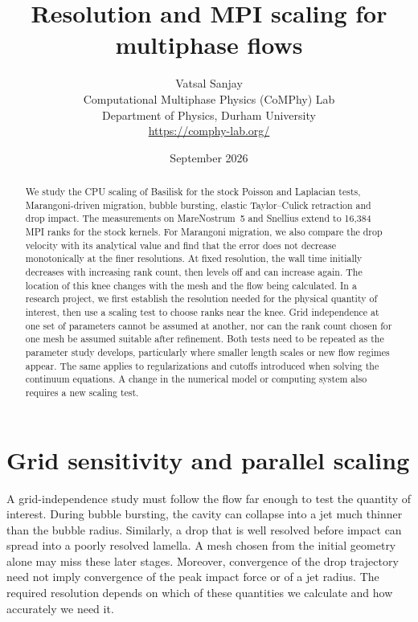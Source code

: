 \documentclass[11pt,a4paper]{article}
\title{\textbf{Resolution and MPI scaling for multiphase flows}}
\author{Vatsal Sanjay\\
\small Computational Multiphase Physics (CoMPhy) Lab\\
\small Department of Physics, Durham University\\
\small \url{https://comphy-lab.org/}}
\date{September 2026}
\begin{document}
\maketitle

\begin{abstract}

We study the CPU scaling of Basilisk for the stock Poisson and Laplacian
tests, Marangoni-driven migration, bubble bursting, elastic Taylor--Culick
retraction and drop impact. The measurements on MareNostrum~5 and Snellius
extend to 16,384 MPI ranks for the stock kernels. For Marangoni migration,
we also compare the drop velocity with its analytical value and find that
the error does not decrease monotonically at the finer resolutions.
At fixed resolution, the wall time initially decreases with increasing
rank count, then levels off and can increase again. The location of this
knee changes with the mesh and the flow being calculated. In a research
project, we first establish the resolution needed for the physical quantity
of interest, then use a scaling test to choose ranks near the knee.
Grid independence at one set of parameters cannot be assumed at another,
nor can the rank count chosen for one mesh be assumed suitable after
refinement. Both tests need to be repeated as the parameter study develops,
particularly where smaller length scales or new flow regimes appear.
The same applies to regularizations and cutoffs introduced when solving
the continuum equations. A change in the numerical model or computing
system also requires a new scaling test.

\end{abstract}

\section{Grid sensitivity and parallel scaling}

A grid-independence study must follow the flow far enough to test the
quantity of interest. During bubble bursting, the cavity can collapse into
a jet much thinner than the bubble radius. Similarly, a drop that is well
resolved before impact can spread into a poorly resolved lamella. A mesh
chosen from the initial geometry alone may miss these later stages.
Moreover, convergence of the drop trajectory need not imply convergence of
the peak impact force or of a jet radius. The required resolution depends
on which of these quantities we calculate and how accurately we need it.
\end{document}
